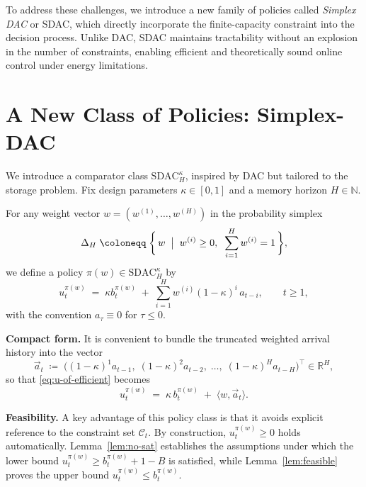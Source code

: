 To address these challenges, we introduce a new family of policies called \emph{Simplex DAC} or SDAC, which directly incorporate the finite-capacity constraint into the decision process.  
Unlike DAC, SDAC maintains tractability without an explosion in the number of constraints, enabling efficient and theoretically sound online control under energy limitations.



\section{A New Class of Policies: Simplex-DAC}

We introduce a comparator class \(\mathrm{SDAC}_H^\kappa\), inspired by DAC but tailored to the storage problem.  
Fix design parameters \(\kappa \in [0,1]\) and a memory horizon \(H \in \mathbb{N}\).  

For any weight vector \(w = (w^{(1)},\dots,w^{(H)})\) in the probability simplex
\[
\Delta_H \;\coloneqq\;
\biggl\{\,w \;\bigm|\; w^{(i)} \ge 0, \;\; \sum_{i=1}^H w^{(i)} = 1 \,\biggr\},
\]
we define a policy \(\pi(w) \in \mathrm{SDAC}_H^\kappa\) by
\begin{equation}\label{eq:u-of-efficient}
u_t^{\pi(w)} \;=\; \kappa b_t^{\pi(w)} \;+\; \sum_{i=1}^H w^{(i)} (1-\kappa)^i \, a_{t-i},
\qquad t \ge 1,
\end{equation}
with the convention \(a_\tau \equiv 0\) for \(\tau \le 0\).

\textbf{Compact form.}
It is convenient to bundle the truncated weighted arrival history into the vector
\[
\vec{a}_t
\;\coloneqq\;
\bigl((1-\kappa)^1 a_{t-1},\; (1-\kappa)^2 a_{t-2},\;\dots,\; (1-\kappa)^H a_{t-H}\bigr)^\top
\in \mathbb{R}^H ,
\]
so that \eqref{eq:u-of-efficient} becomes
\[
u_t^{\pi(w)} \;=\; \kappa\, b_t^{\pi(w)} \;+\; \langle w,\vec{a}_t\rangle.
\]



\textbf{Feasibility.}
A key advantage of this policy class is that it avoids explicit reference to the constraint set \(\mathcal{C}_t\).  
By construction, \(u_t^{\pi(w)} \ge 0\) holds automatically.  
Lemma~\ref{lem:no-sat} establishes the assumptions under which the lower bound \(u_t^{\pi(w)} \ge b_t^{\pi(w)} + 1 - B\) is satisfied, while Lemma~\ref{lem:feasible} proves the upper bound \(u_t^{\pi(w)} \le b_t^{\pi(w)}\).




